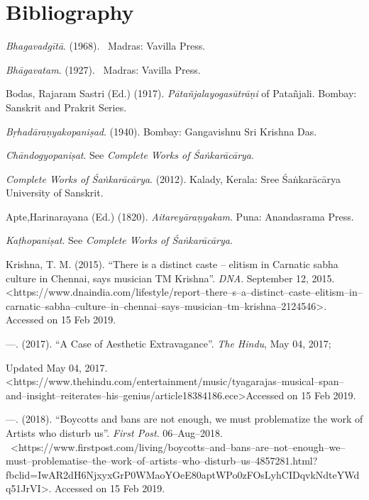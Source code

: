 \section*{Bibliography}

\begin{thebibliography}{99}
\item \textit{Bhagavadgītā}. (1968).  Madras: Vavilla Press.

 \item \textit{Bhāgavatam}. (1927).  Madras: Vavilla Press.

 \item Bodas, Rajaram Sastri (Ed.) (1917). \textit{Pātañjalayogasūtrāṇi} of Patañjali. Bombay: Sanskrit and Prakrit Series.

 \item \textit{Bṛhadāraṇyakopaniṣad}. (1940). Bombay: Gangavishnu Sri Krishna Das.

 \item \textit{Chāndogyopaniṣat}. See \textit{Complete Works of Śaṅkarācārya}.

 \item \textit{Complete Works of Śaṅkarācārya}. (2012). Kalady, Kerala: Sree Śaṅkarācārya University of Sanskrit.

 \item Apte,Harinarayana (Ed.) (1820). \textit{Aitareyāraṇyakam}. Puna: Anandasrama Press.

 \item \textit{Kaṭhopaniṣat}. See \textit{Complete Works of Śaṅkarācārya}.

 \item Krishna, T. M. (2015). “There is a distinct caste – elitism in Carnatic sabha culture in Chennai, says musician TM Krishna”. \textit{DNA}. September 12, 2015. \textless  https://www.dnaindia.com/lifestyle/report–there–s–a–distinct–caste–elitism–in–carnatic–sabha–culture–in–chennai–says–musician–tm–krishna–2124546\textgreater . Accessed on 15 Feb 2019.

 \item —. (2017). “A Case of Aesthetic Extravagance”. \textit{The Hindu}, May 04, 2017;

 \item Updated May 04, 2017. \textless https://www.thehindu.com/entertainment/music/tyagarajas–musical–span–and–insight–reiterates–his–genius/article18384186.ece\textgreater  Accessed on 15 Feb 2019.

 \item —. (2018). “Boycotts and bans are not enough, we must problematize the work of Artists who disturb us”. \textit{First Post}. 06–Aug–2018.  \textless https://www.firstpost.com/living/boycotts–and–bans–are–not–enough–we–must–problematise–the–work–of–artists–who–disturb–us–4857281.html?fbclid=IwAR2dH6NjxyxGrP0WMaoYOeE80aptWPo0zFOsLyhCIDqvkNdteYWdq51JrVI\textgreater . Accessed on 15 Feb 2019.


\end{thebibliography}

